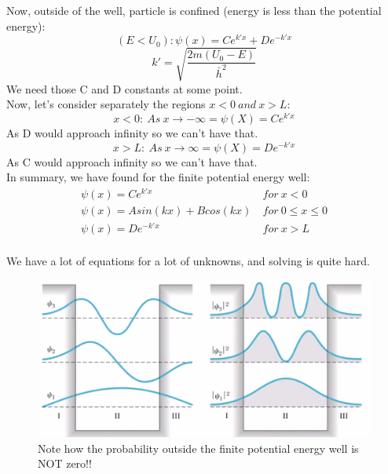 \documentclass[class=article,crop=false]{standalone}
\begin{document}
Now, outside of the well, particle is confined (energy is less than the potential energy):
$$ (E < U_0): \psi(x) = C e^{k'x} + De^{-k'x} $$
$$ k' = \sqrt{\frac{2m(U_0 - E)}{\bar{h}^2}} $$
We need those C and D constants at some point. \\

Now, let's consider separately the regions $x < 0\ and\ x > L$:
$$ x < 0:\ As\ x \rightarrow -\infty = \psi(X) = Ce^{k'x} $$
As D would approach infinity so we can't have that.
$$ x > L:\ As\ x \rightarrow \infty = \psi(X) = De^{-k'x} $$
As C would approach infinity so we can't have that. \\

In summary, we have found for the finite potential energy well:\\
\begin{align*}
	\psi(x) = C e^{k'x} & \ for\ x < 0 \\
	\psi(x) = A sin(kx) + B cos(kx) & \ for\ 0 \leq x \leq 0 \\
	\psi(x) = D e^{-k'x} & \ for\ x > L 
\end{align*} \\
We have a lot of equations for a lot of unknowns, and solving is quite hard.

\begin{figure}[h!]
	\centering
	\includegraphics[width=.9\linewidth]{./Images/three_lowest.png}
	\caption{Note how the probability outside the finite potential energy well is NOT zero!!}
\end{figure}
\end{document}
